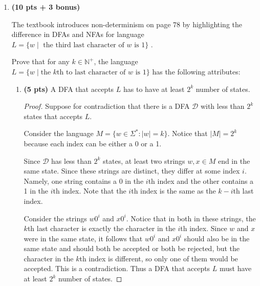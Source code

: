 \documentclass[11pt]{article}
\begin{document}
\begin{enumerate}[label=\textbf{Q\arabic*.}]
\begin{enumerate}[label=\textit{\alph*)}]
	\begin{proof}
		First, notice that in order for a string \(w\) to be a member of \(\mathcal{L} ((aa)^*)\), \(w = (a)^{2k}\) for some natural \(k\). Let \(n \in \mathbb{N}\). Let \(x = \varepsilon\), \(y = a\), \(z = \varepsilon\). Let \(m = n + 1 \geq n\). Then \(xy^m z = a^{n+1} \), and \(xy^n z = a^n\). The goal is to show that either \(a^{n+1} \in L \land a^n \notin L\) or \(a^{n+1} \notin L \land a^n \in L\). Indeed, exactly one of \(n+1\) or \(n\) are even, it must be true that exactly one of \(a^n\) or \(a^{n+1}\) are in \(\mathcal{L} ((aa)^*)\), and the conclusion follows promptly.

	\end{proof}

\end{enumerate}


(Continued on the next page)

\newpage

\item \textbf{(10 pts + 3 bonus)}

The textbook introduces non-determinism on page 78 by highlighting the difference in DFAs and NFAs for language $L = \{w \mid \text{ the third last character of } w \text{ is } 1\}$ . 

Prove that for any $k\in \mathbb{N}^+$, the language $L = \{ w \mid \text{the } k\text{th to last character of } w \text{ is } 1\}$ has the following attributes:


\begin{enumerate}[label=\textit{\alph*)}]
\item \textbf{(5 pts)} A DFA that accepts $L$ has to have at least $2^k$ number of states.
\begin{proof}
	Suppose for contradiction that there is a DFA \(\mathcal{D}\) with less than \(2^k\) states that accepts \(L\).

	Consider the language \(M = \{w \in \Sigma ^* : |w| = k\}\). Notice that \(|M| = 2^k\) because each index can be either a 0 or a 1.

	Since \(\mathcal{D}\) has less than \(2^k\) states, at least two strings \(w,x \in M\) end in the same state. Since these strings are distinct, they differ at some index \(i\). Namely, one string contains a 0 in the \(i\)th index and the other contains a 1 in the \(i\)th index. Note that the \(i\)th index is the same as the \(k-i\)th last index.

	Consider the strings \(w0^i\) and \(x0^i\). Notice that in both in these strings, the \(k\)th last character is exactly the character in the \(i\)th index. Since \(w\) and \(x\) were in the same state, it follows that \(w0^i\) and \(x0^i\) should also be in the same state and should both be accepted or both be rejected, but the character in the \(k\)th index is different, so only one of them would be accepted. This is a contradiction. Thus a DFA that accepts \(L\) must have at least \(2^k\) number of states.
	\smallbreak
\end{proof}


\end{enumerate}
\end{enumerate}
\end{document}
